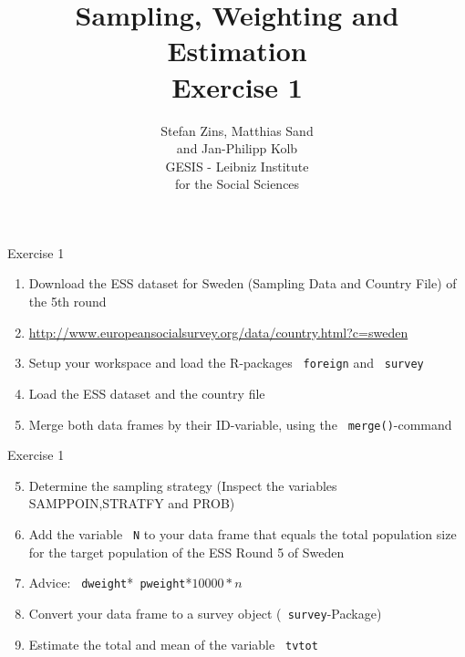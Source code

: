 \documentclass[11pt,german,hideothersubsections]{beamer}\usepackage[]{graphicx}\usepackage[]{color}
\title[Day 1]{Sampling, Weighting and Estimation\\ \Large{Exercise 1} }
\author[M. Sand]{Stefan Zins, Matthias Sand\\ and Jan-Philipp Kolb\\ \vspace{.5cm} \footnotesize{GESIS - Leibniz Institute\\ for the Social Sciences}}
\newcommand{\R}[1]{{\tt \color{blue}  #1}}
\begin{document}
\maketitle



\begin{frame}[fragile]{Exercise 1}

\begin{enumerate}

\item Download the ESS dataset for Sweden (Sampling Data and Country File) of the 5th round
\item[] \alert{\url{http://www.europeansocialsurvey.org/data/country.html?c=sweden}}
\item Setup your workspace and load the R-packages \R{foreign} and \R{survey}
\item Load the ESS dataset and the country file
\item Merge both data frames by their ID-variable, using the \R{merge()}-command

\end{enumerate}

\end{frame}
\begin{frame}[fragile]{Exercise 1}

\begin{enumerate}

\setcounter{enumi}{4}
\item Determine the sampling strategy (Inspect the variables \alert{SAMPPOIN},\alert{STRATFY} and \alert{PROB})
\item Add the variable \R{N} to your data frame that equals the total population size for the target population of the ESS Round 5 of Sweden
\item[] \alert{Advice:} \R{dweight}*\R{pweight}*$10000*n$
\item Convert your data frame to a survey object (\R{survey}-Package)
\item Estimate the total and mean of the variable \R{tvtot}

\end{enumerate}

\end{frame}
\end{document}
